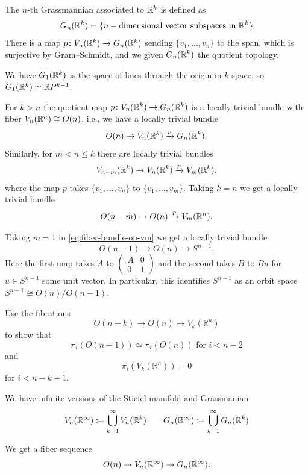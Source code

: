 \documentclass[ma3408.tex]{subfiles}
\begin{document}
\begin{Def}
The $n$-th Grassmannian associated to $\mathbb{R}^k$ is defined as 
\[
G_n(\mathbb{R}^k) = \{ n-\text{dimensional vector subspaces in } \mathbb{R}^k \}
\]
There is a map $p \colon V_n(\mathbb{R}^k) \to G_n(\mathbb{R}^k)$ sending $\{ v_1,\ldots,v_n\}$ to the span, which is surjective by Gram--Schmidt, and we given $G_n(\mathbb{R}^k)$ the quotient topology. 
\end{Def}
\begin{Exa}
We have $G_1(\mathbb{R}^k)$ is the space of lines through the origin in $k$-space, so $G_1(\mathbb{R}^k) \simeq \mathbb{R} P^{k-1}$.
\end{Exa}
\begin{Lem}
	For $k>n$ the quotient map $p \colon V_n(\mathbb{R}^k) \to G_n(\mathbb{R}^k)$ is a locally trivial bundle with fiber $V_n(\mathbb{R}^n) \cong O(n)$, i.e., we have a locally trivial bundle
	\begin{equation}\label{eq:fiber-bundle-vn-gn}
	O(n) \to V_n(\mathbb{R}^k) \xrightarrow{p} G_n(\mathbb{R}^k). 
	\end{equation}
	Similarly, for $m <n \le k$ there are locally trivial bundles 
		\begin{equation}\label{eq:fiber-bundle-vn-vm}
	V_{n-m}(\mathbb{R}^k) \to V_n(\mathbb{R}^k) \xrightarrow{p} V_m(\mathbb{R}^k). 
	\end{equation}
	where the map $p$ takes $\{ v_1,\ldots,v_n\}$ to $\{ v_1,\ldots,v_m \}$. Taking $k =n$ we get a locally trivial bundle
			\begin{equation}\label{eq:fiber-bundle-on-vm}
	O(n-m) \to O(n) \xrightarrow{p} V_m(\mathbb{R}^n). 
	\end{equation}
\end{Lem}
\begin{Exa}
Taking $m = 1$ in \eqref{eq:fiber-bundle-on-vm} we get a locally trivial bundle
\[
O(n-1) \to O(n) \to S^{n-1}.
\]
Here the first map takes $A$ to $ \begin{pmatrix}
A & 0 \\
0 & 1 
\end{pmatrix}  $ and the second takes $B$ to $Bu$ for $u \in S^{n-1}$ some unit vector. In particular, this identifies $S^{n-1}$ as an orbit space $S^{n-1} \cong O(n)/O(n-1)$. 
\end{Exa}
\begin{exercise}{}{}
Use the fibrations
\[
O(n-k) \to O(n) \to V_k(\mathbb{R}^n)
\]
to show that
\[
\pi_i(O(n-1)) \simeq \pi_i(O(n)) \text{ for } i < n-2
\]
and
\[
\pi_i(V_k(\mathbb{R}^n)) = 0
\]
for $i < n-k-1$. 
\end{exercise}
\begin{Def}
We have infinite versions of the Stiefel manifold and Grassmanian:
\[
V_n(\mathbb{R}^{\infty}) \coloneqq \bigcup_{k=1}^{\infty} V_n(\mathbb{R}^k) \quad \quad G_n(\mathbb{R}^{\infty}) \coloneqq \bigcup_{k=1}^{\infty} G_n(\mathbb{R}^k)
\]
\end{Def}
\begin{Rem}
We get a fiber sequence 
\[
O(n) \to V_n(\mathbb{R}^{\infty}) \to G_n(\mathbb{R}^{\infty}).
\]
\end{Rem}
\end{document}
